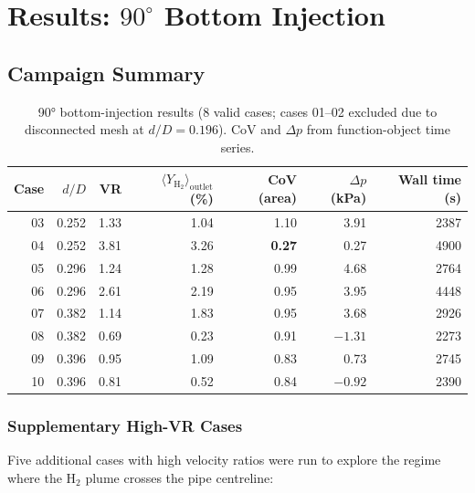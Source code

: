 \documentclass[12pt,a4paper]{report}
\begin{document}
\chapter{Results: $90^{\circ}$ Bottom Injection}
\label{ch:results90}

\section{Campaign Summary}

\begin{table}[H]
\centering
\caption{90° bottom-injection results (8 valid cases; cases 01--02
         excluded due to disconnected mesh at $d/D = 0.196$).
         CoV and $\Delta p$ from function-object time series.}
\label{tab:results90}
\small
\begin{tabular}{@{}rrrrrrr@{}}
\toprule
\textbf{Case} & $d/D$ & VR & $\langle Y_{\mathrm{H_2}}\rangle_{\mathrm{outlet}}$ (\%) & \textbf{CoV} (area) & $\Delta p$ (kPa) & Wall time (s) \\
\midrule
03 & 0.252 & 1.33 & 1.04 & 1.10 & 3.91 & 2387 \\
04 & 0.252 & 3.81 & 3.26 & \textbf{0.27} & 0.27 & 4900 \\
05 & 0.296 & 1.24 & 1.28 & 0.99 & 4.68 & 2764 \\
06 & 0.296 & 2.61 & 2.19 & 0.95 & 3.95 & 4448 \\
07 & 0.382 & 1.14 & 1.83 & 0.95 & 3.68 & 2926 \\
08 & 0.382 & 0.69 & 0.23 & 0.91 & $-1.31$ & 2273 \\
09 & 0.396 & 0.95 & 1.09 & 0.83 & 0.73 & 2745 \\
10 & 0.396 & 0.81 & 0.52 & 0.84 & $-0.92$ & 2390 \\
\bottomrule
\end{tabular}
\end{table}

\subsection{Supplementary High-VR Cases}

Five additional cases with high velocity ratios were run to explore
the regime where the H$_2$ plume crosses the pipe centreline:
\end{document}
